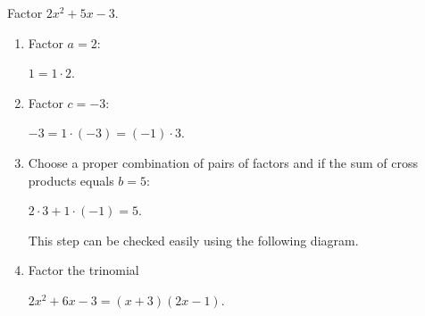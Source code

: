 \begin{multicols}{2}
		\columnbreak

		\begin{example}
			Factor $2x^2+5x-3$.
		\end{example}

		\begin{solution}\mbox{}
			\begin{enumerate}[label={\textbf{\textup{Step \arabic*.}}~}]
				\item Factor $a=2$:\\ \centerline{$1=1\cdot 2$.}
				\item Factor $c=-3$:\\ \centerline{$-3=1\cdot (-3)=(-1)\cdot 3$.}
				\item Choose a proper combination of pairs of factors and if the sum of cross products equals $b=5$:\\
				      \centerline{$2\cdot 3+1\cdot(-1)=5$.}
				      This step can be checked easily using the following diagram.\\
				      \begin{minipage}{0.45\textwidth}
					      \begin{center}
					      \end{center}
				      \end{minipage}
				\item Factor the trinomial\\
				      \centerline{$2x^2+6x-3=(x+3)(2x-1)$.}
			\end{enumerate}
		\end{solution}

	\end{multicols}


